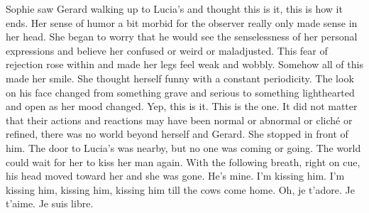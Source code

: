 

Sophie saw Gerard walking up to Lucia's and thought this is it, this
is how it ends.  Her sense of humor a bit morbid for the observer
really only made sense in her head.  She began to worry that he would
see the senselessness of her personal expressions and believe her
confused or weird or maladjusted.  This fear of rejection rose within
and made her legs feel weak and wobbly.  Somehow all of this made her
smile.  She thought herself funny with a constant periodicity.  The
look on his face changed from something grave and serious to something
lighthearted and open as her mood changed.  Yep, this is it.  This is
the one.  It did not matter that their actions and reactions may have
been normal or abnormal or clich\'e or refined, there was no world
beyond herself and Gerard.  She stopped in front of him.  The door to
Lucia's was nearby, but no one was coming or going.  The world could
wait for her to kiss her man again.  With the following breath, right
on cue, his head moved toward her and she was gone.  He's mine.  I'm
kissing him.  I'm kissing him, kissing him, kissing him till the cows
come home.  Oh, je t'adore.  Je t'aime.  Je suis libre.

\bye
